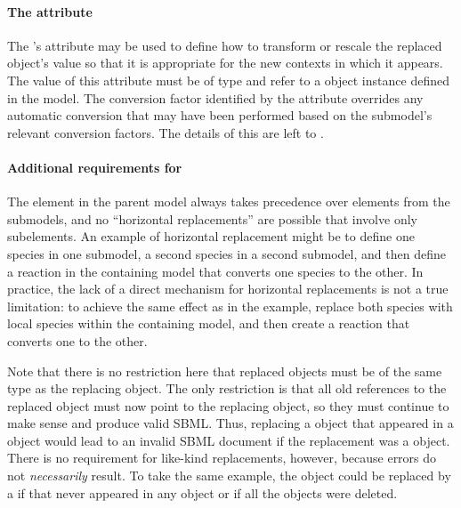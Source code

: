 \paragraph{The \hspace*{1pt} attribute}
\label{replacedelement-conversionfactor}

The \ReplacedElement's  attribute may be used to
define how to transform or rescale the replaced object's value so that
it is appropriate for the new contexts in which it appears.  The value
of this attribute must be of type  and refer to a
\Parameter object instance defined in the model.  The conversion factor
identified by the  attribute overrides any
automatic conversion that may have been performed based on the
submodel's relevant conversion factors.  The details of this are left to
.


\paragraph{Additional requirements for }
\label{replacedelement-additional}

The element in the parent model always takes precedence over elements
from the submodels, and no ``horizontal replacements'' are possible that
involve only subelements.  An example of horizontal replacement might be
to define one species in one submodel, a second species in a second
submodel, and then define a reaction in the containing model that
converts one species to the other.  In practice, the lack of a direct
mechanism for horizontal replacements is not a true limitation: to
achieve the same effect as in the example, replace both species with
local species within the containing model, and then create a reaction
that converts one to the other.

Note that there is no restriction here that replaced objects must be of
the same type as the replacing object.  The only restriction is that all
old references to the replaced object must now point to the replacing
object, so they must continue to make sense and produce valid SBML.
Thus, replacing a \Species object that appeared in a \Reaction object
would lead to an invalid SBML document if the replacement was a
\Parameter object.  There is no requirement for like-kind replacements,
however, because errors do not \emph{necessarily} result.  To take the
same example, the \Species object could be replaced by a \Parameter if
that \Species never appeared in any \Reaction object or if all the
\Reaction objects were deleted.  


